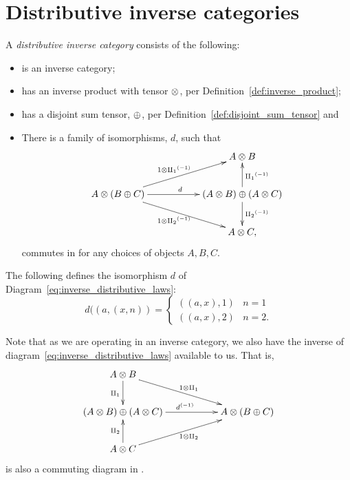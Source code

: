 \section{Distributive inverse categories} %
\label{sec:distributive_inverse_categories}
%
\begin{definition}\label{def:distributive_inverse_category}
  A \emph{distributive inverse category} \D consists of the following:
  \begin{itemize}
    \item \D is an inverse category;
    \item \D has an inverse product with tensor $\otimes$, per Definition~\ref{def:inverse_product};
    \item \D has a disjoint sum tensor, $\oplus$, per Definition~\ref{def:disjoint_sum_tensor} and
    \item There is a family of isomorphisms, $d$, such that
    \begin{equation}
      \xymatrix{
      && A\*B\\
      A \* (B \+ C) \ar[rr]^{d} \ar[urr]^{1\*\icpa} \ar[drr]_{1\*\icpb}
        && (A\*B) \+ (A \* C) \ar[u]_{\icpa} \ar[d]^{\icpb}\\
      && A\*C,
      }\label{eq:inverse_distributive_laws}
    \end{equation}
    commutes in \D for any choices of objects $A, B, C$.
  \end{itemize}
\end{definition}

\begin{example}
  The following defines the isomorphism $d$ of Diagram~\ref{eq:inverse_distributive_laws}:
  \begin{equation}
    d((a,(x,n)) = \begin{cases}
      ((a,x),1) & n = 1\\
      ((a,x),2) & n = 2.
      \end{cases}\label{eq:pinj_distributive_isomporphism}
    \end{equation}
\end{example}
Note that as we are operating in an inverse category, we also have the inverse of
diagram~\ref{eq:inverse_distributive_laws} available to us. That is,
\begin{equation}
  \xymatrix{
  A\*B \ar[d]_{\cpa} \ar[drr]^{1\*\cpa}\\
  (A\*B) \+ (A \* C)  \ar[rr]^{\inv{d}}  &&A \* (B \+ C) \\
  A\*C\ar[u]^{\cpb} \ar[urr]_{1\*\cpb}
  }\label{eq:inverse_distributive_laws_reversed}
\end{equation}
is also a commuting diagram in \D.

